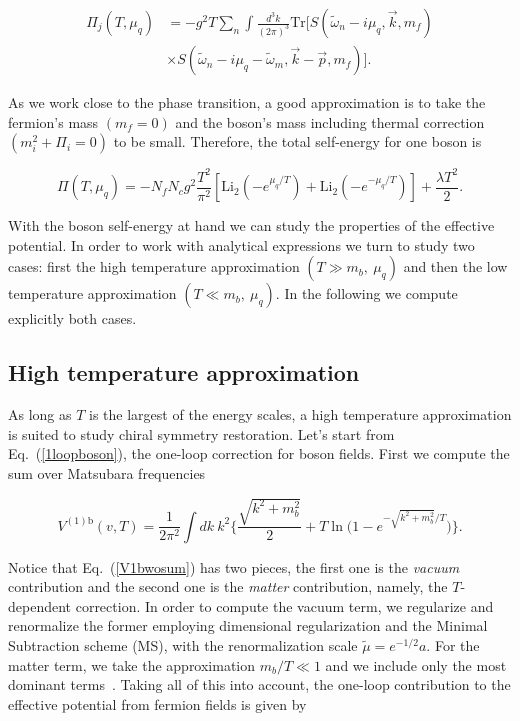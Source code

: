 \documentclass[%
 reprint,
showpacs,preprintnumbers,
 amsmath,amssymb,
onecolumn]{revtex4}
\begin{document}
\begin{align}
    \Pi_j(T,\mu_q)&=-g^2 T\sum_n\int \frac{d^3k}{(2\pi)^3}\text{Tr}[S(\tilde{\omega}_n-i\mu_q,\vec{k},m_f)\nonumber \\
    &\times S(\tilde{\omega}_n-i\mu_q-\tilde{\omega}_m,\vec{k}-\vec{p},m_f)].
    \label{selfEF}
\end{align}

As we work close to the phase transition, a good approximation is to take the fermion's mass $(m_f=0)$ and the boson's mass including thermal correction $(m_i^2+\Pi_i=0)$ to be small. Therefore, the total self-energy for one boson is

\begin{equation}
    \Pi(T,\mu_q)=-N_fN_cg^2\frac{T^2}{\pi^2}[\text{Li}_2(-e^{\mu_q/T})+\text{Li}_2(-e^{-\mu_q/T})]+\frac{\lambda T^2}{2}.
    \label{fullselfenergy}
\end{equation}

With the boson self-energy at hand we can study the properties of the effective potential. In order to work with analytical expressions we turn to study two cases: first the high temperature approximation $(T\gg m_b, \ \mu_q)$ and then the low temperature approximation $(T\ll m_b, \ \mu_q)$. In the following we compute explicitly both cases.


\subsection{\label{HTapprox}High temperature approximation}

As long as $T$ is the largest of the energy scales, a high temperature approximation is suited to study chiral symmetry restoration. Let's start from Eq.~(\ref{1loopboson}), the one-loop correction for boson fields. First we compute the sum over Matsubara frequencies

\begin{equation}
    V^{(1)\text{b}}(v,T)=\frac{1}{2\pi^2}\int dk \ k^2\Big \{ \frac{\sqrt{k^2+m_b^2}}{2} +T\ln \Big(1-e^{-\sqrt{k^2+m_b^2}/T} \Big) \Big \}.
    \label{V1bwosum}
\end{equation}

Notice that Eq.~(\ref{V1bwosum}) has two pieces, the first one is the \textit{vacuum} contribution and the second one is the \textit{matter} contribution, namely, the $T$-dependent correction. In order to compute the vacuum term, we regularize and renormalize the former employing dimensional regularization and the Minimal Subtraction scheme (MS), with the renormalization scale $\tilde{\mu}=e^{-1/2}a$. For the matter term, we take the approximation $m_b/T\ll 1$ and we include only the most dominant terms~\cite{Ayala1,Ayala2}. Taking all of this into account, the one-loop contribution to the effective potential from fermion fields is given by
\end{document}
